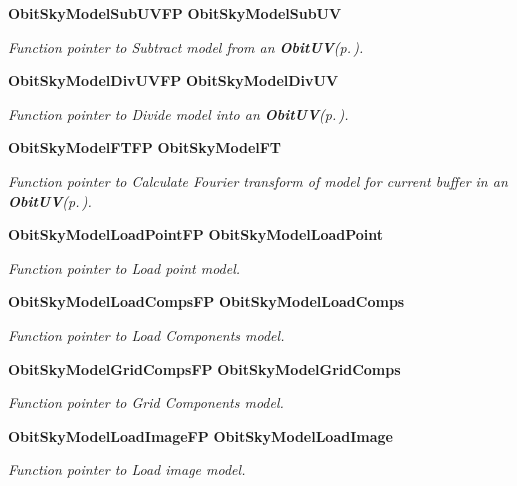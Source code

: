 \begin{CompactItemize}
{\bf Obit\-Sky\-Model\-Sub\-UVFP} {\bf Obit\-Sky\-Model\-Sub\-UV}
\begin{CompactList}\small\item\em Function pointer to Subtract model from an {\bf Obit\-UV}{\rm (p.\,\pageref{structObitUV})}. \item\end{CompactList}\item 
{\bf Obit\-Sky\-Model\-Div\-UVFP} {\bf Obit\-Sky\-Model\-Div\-UV}
\begin{CompactList}\small\item\em Function pointer to Divide model into an {\bf Obit\-UV}{\rm (p.\,\pageref{structObitUV})}. \item\end{CompactList}\item 
{\bf Obit\-Sky\-Model\-FTFP} {\bf Obit\-Sky\-Model\-FT}
\begin{CompactList}\small\item\em Function pointer to Calculate Fourier transform of model for current buffer in an {\bf Obit\-UV}{\rm (p.\,\pageref{structObitUV})}. \item\end{CompactList}\item 
{\bf Obit\-Sky\-Model\-Load\-Point\-FP} {\bf Obit\-Sky\-Model\-Load\-Point}
\begin{CompactList}\small\item\em Function pointer to Load point model. \item\end{CompactList}\item 
{\bf Obit\-Sky\-Model\-Load\-Comps\-FP} {\bf Obit\-Sky\-Model\-Load\-Comps}
\begin{CompactList}\small\item\em Function pointer to Load Components model. \item\end{CompactList}\item 
{\bf Obit\-Sky\-Model\-Grid\-Comps\-FP} {\bf Obit\-Sky\-Model\-Grid\-Comps}
\begin{CompactList}\small\item\em Function pointer to Grid Components model. \item\end{CompactList}\item 
{\bf Obit\-Sky\-Model\-Load\-Image\-FP} {\bf Obit\-Sky\-Model\-Load\-Image}
\begin{CompactList}\small\item\em Function pointer to Load image model. \item\end{CompactList}\item 

\end{CompactItemize}
